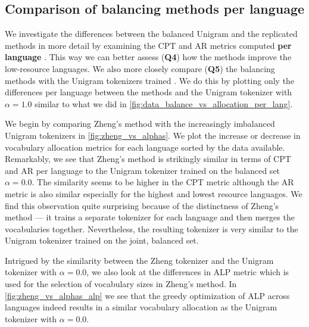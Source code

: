 \subsection{Comparison of balancing methods per language}
\label{sec:comparison_balancing_methods_per_lang}

We investigate the differences between the balanced Unigram and the replicated methods in more detail by examining the CPT and AR metrics computed \textbf{per language} . This way we can better assess (\textbf{Q4}) how the methods improve the low-resource languages. We also more closely compare (\textbf{Q5}) the balancing methods with the Unigram tokenizers trained . We do this by plotting only the differences per language between the methods and the Unigram tokenizer with  $\alpha=1.0$ similar to what we did in \autoref{fig:data_balance_vs_allocation_per_lang}.

We begin by comparing Zheng's method with the increasingly imbalanced Unigram tokenizers in \autoref{fig:zheng_vs_alphas}. We plot the increase or decrease in vocabulary allocation metrics for each language sorted by the data available. Remarkably, we see that Zheng's method is strikingly similar in terms of CPT and AR per language to the Unigram tokenizer trained on the balanced set $\alpha=0.0$. The similarity seems to be higher in the CPT metric although the AR metric is also similar especially for the highest and lowest resource languages. We find this observation quite surprising because of the distinctness of Zheng's method --- it trains a separate tokenizer for each language and then merges the vocabularies together. Nevertheless, the resulting tokenizer is very similar to the Unigram tokenizer trained on the joint, balanced set. 

Intrigued by the similarity between the Zheng tokenizer and the Unigram tokenizer with $\alpha=0.0$, we also look at the differences in ALP metric which is used for the selection of vocabulary sizes in Zheng's method. In \autoref{fig:zheng_vs_alphas_alp} we see that the greedy optimization of ALP across languages indeed results in a similar vocabulary allocation as the Unigram tokenizer with $\alpha=0.0$.


